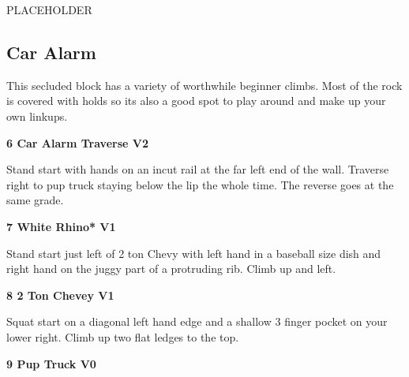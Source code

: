 \begin{multicols}{2}
\begin{minipage}{\linewidth}
					\begin{adjustwidth}{0.5cm}{}				
					PLACEHOLDER
					\end{adjustwidth}
					\end{minipage}

			\begin{minipage}{\columnwidth}
			\subsection*{Car Alarm}\label{bf:Car Alarm}
			This secluded block has a variety of worthwhile beginner climbs. Most of the rock is covered with holds so its also a good spot to play around and make up your own linkups.
			
			\end{minipage}
			
					\begin{minipage}{\linewidth}	
					\label{rt:Car Alarm Traverse}
\colorbox{green!20}{
\parbox{0.95\textwidth}{
\textbf{
6 Car Alarm Traverse V2    
}
}
}

					\begin{adjustwidth}{0.5cm}{}				
					Stand start with hands on an incut rail at the far left end of the wall. Traverse right to pup truck staying below the lip the whole time. The reverse goes at the same grade.
					\end{adjustwidth}
					\end{minipage}
					\begin{minipage}{\linewidth}	
					\label{rt:White Rhino}
\colorbox{green!20}{
\parbox{0.95\textwidth}{
\textbf{
7 White Rhino* V1   
}
}
}

					\begin{adjustwidth}{0.5cm}{}				
					Stand start just left of 2 ton Chevy with left hand in a baseball size dish and right hand on the juggy part of a protruding rib. Climb up and left.
					\end{adjustwidth}
					\end{minipage}
					\begin{minipage}{\linewidth}	
					\label{rt:2 Ton Chevey}
\colorbox{green!20}{
\parbox{0.95\textwidth}{
\textbf{
8 2 Ton Chevey V1    
}
}
}

					\begin{adjustwidth}{0.5cm}{}				
					Squat start on a diagonal left hand edge and a shallow 3 finger pocket on your lower right. Climb up two flat ledges to the top.
					\end{adjustwidth}
					\end{minipage}
					\begin{minipage}{\linewidth}	
					\label{rt:Pup Truck}
\colorbox{green!20}{
\parbox{0.95\textwidth}{
\textbf{
9 Pup Truck V0    
}
}
}


\end{minipage}
\end{multicols}
